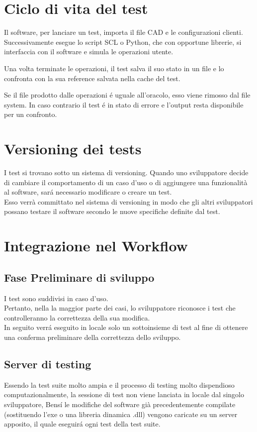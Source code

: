     \section{Ciclo di vita del test}
        Il software, per lanciare un test, importa il file CAD e le configurazioni clienti.
        Successivamente esegue lo script SCL o Python, che con opportune librerie, si interfaccia con il software
        e simula le operazioni utente. 
        
        Una volta terminate le operazioni, il test salva il suo stato in un file e lo confronta con la sua reference 
        salvata nella cache del test. 

        Se il file prodotto dalle operazioni \'e uguale all'oracolo, esso viene rimosso dal file system.
        In caso contrario il test \'e in stato di errore e l'output resta disponibile per un confronto.

    \section{Versioning dei tests}
            I test si trovano sotto un sistema di versioning.
            Quando uno sviluppatore decide di cambiare il comportamento di un caso d'uso o di aggiungere una funzionalità al software,
            sar\'a necessario modificare o creare un test.\\
            Esso verrà committato nel sistema di versioning in modo che gli altri sviluppatori possano testare il software secondo le nuove specifiche definite dal test.    
            
    \section{Integrazione nel Workflow}
        \subsection{Fase Preliminare di sviluppo}
            I test sono suddivisi in caso d'uso.\\
            Pertanto, nella la maggior parte dei casi, lo sviluppatore riconosce i test che controlleranno la correttezza della sua modifica.\\
            In seguito verr\'a eseguito in locale solo un sottoinsieme di test al fine di ottenere una conferma preliminare della correttezza dello sviluppo. \\
        \subsection{Server di testing}
            Essendo la test suite molto ampia e il processo di testing molto dispendioso computazionalmente, 
            la sessione di test non viene lanciata in locale dal singolo sviluppatore, 
            Bens\'i  le modifiche del software già precedentemente compilate (sostituendo l’exe o una libreria dinamica .dll) 
            vengono caricate su un server apposito, il quale eseguir\'a ogni test della test suite.
            
